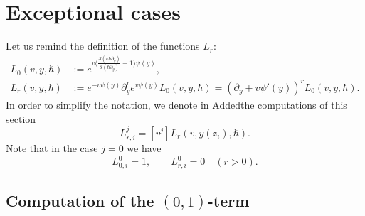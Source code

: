 \documentclass[11pt]{article}
\let\mathcal\mathscr
\theoremstyle{plain}
\theoremstyle{definition}
\theoremstyle{remark}
\newcommand{\cS}{\mathcal{S}}
\begin{document}
\section{Exceptional cases}\label{sec:exceptions}

Let us remind the definition of the functions $L_r$:
\begin{align*}
L_0(v,y,\hbar)&:=e^{v\bigl(\frac{\cS(v\hbar\partial_y)}{\cS(\hbar\partial_y)}-1\bigr)\psi(y)},\\
L_r(v,y,\hbar)&:=e^{-v\psi(y)}\partial_y^re^{v\psi(y)}L_0(v,y,\hbar)
=\left(\partial_y+v\psi'(y)\right)^rL_0(v,y,\hbar).
\end{align*}
In order to simplify the notation, we denote in Added{the} computations of this section
\begin{equation*}
L_{r,i}^j=[v^j]L_r(v,y(z_i),\hbar).
\end{equation*}
Note that in the case $j=0$ we have
\begin{equation*}
L_{0,i}^0=1,\qquad L_{r,i}^0=0\quad (r>0).
\end{equation*}

\subsection{Computation of the \texorpdfstring{$(0,1)$}{(0,1)}-term}
\end{document}

